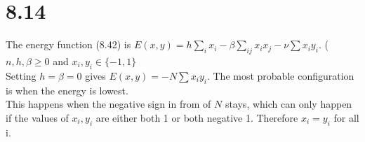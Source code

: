 \documentclass[11pt,leqno,fleqn]{article}
\begin{document}
\section{8.14}
The energy function (8.42) is $E(x,y) = h \sum_i x_i - \beta \sum_{ij}x_i x_j - \nu \sum x_i y_i$. ($n,h,\beta \geq 0$ and $x_i,y_i \in \{-1,1\}$\\
Setting $h = \beta = 0$ gives $E(x,y) = - N \sum x_i y_i $.  The most probable configuration is when the energy is lowest.\\
This happens when the negative sign in from of $N$ stays, which can only happen if the values of $x_i, y_i$ are either both 1 or both negative 1. Therefore $x_i = y_i$ for all i.
\end{document}
